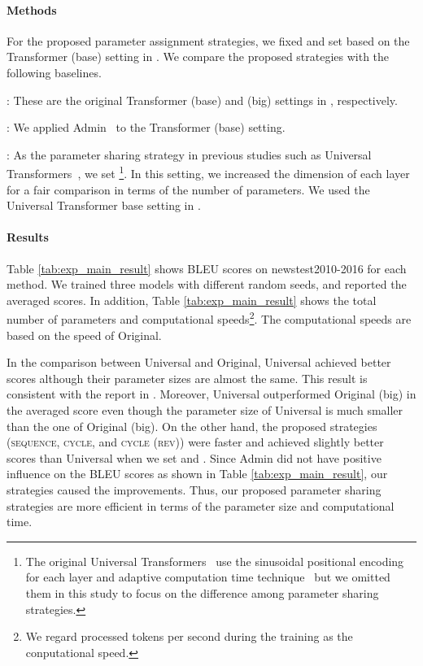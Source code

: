 \documentclass[11pt]{article}
\begin{document}
\paragraph{Methods}
For the proposed parameter assignment strategies, we fixed  and set  based on the Transformer (base) setting in .
We compare the proposed strategies with the following baselines.

: These are the original Transformer (base) and (big) settings in , respectively.

: We applied Admin~\cite{liu-etal-2020-understanding} to the Transformer (base) setting.

: As the parameter sharing strategy in previous studies such as Universal Transformers~\cite{dehghani2019}, we set \footnote{The original Universal Transformers~\cite{dehghani2019} use the sinusoidal positional encoding for each layer and adaptive computation time technique~\cite{graves2017adaptive} but we omitted them in this study to focus on the difference among parameter sharing strategies.}.
In this setting, we increased the dimension of each layer for a fair comparison in terms of the number of parameters.
We used the Universal Transformer base setting in .



\paragraph{Results}
Table \ref{tab:exp_main_result} shows BLEU scores on newstest2010-2016 for each method.
We trained three models with different random seeds, and reported the averaged scores.
In addition, Table \ref{tab:exp_main_result} shows the total number of parameters and computational speeds\footnote{We regard processed tokens per second during the training as the conputational speed.}.
The computational speeds are based on the speed of Original.


In the comparison between Universal and Original, Universal achieved better scores although their parameter sizes are almost the same.
This result is consistent with the report in .
Moreover, Universal outperformed Original (big) in the averaged score even though the parameter size of Universal is much smaller than the one of Original (big).
On the other hand, the proposed strategies (\textsc{sequence}, \textsc{cycle}, and \textsc{cycle (rev)}) were faster and achieved slightly better scores than Universal when we set  and .
Since Admin did not have positive influence on the BLEU scores as shown in Table \ref{tab:exp_main_result}, our strategies caused the improvements.
Thus, our proposed parameter sharing strategies are more efficient in terms of the parameter size and computational time.
\end{document}
